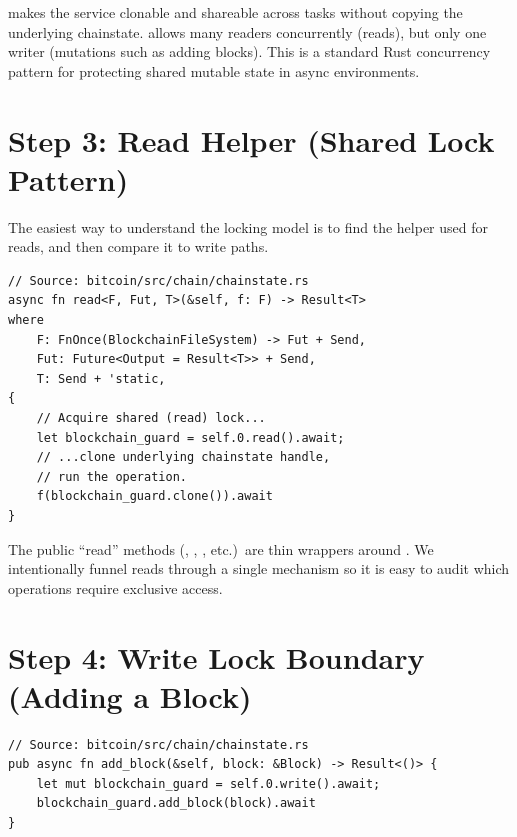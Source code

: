 \begin{infobox}
 makes the service clonable and shareable across tasks without copying the underlying chainstate.  allows many readers concurrently (reads), but only one writer (mutations such as adding blocks). This is a standard Rust concurrency pattern for protecting shared mutable state in async environments.
\end{infobox}

\section{Step 3: Read Helper (Shared Lock Pattern)}
\label{sec:ch09-2-step3}

The easiest way to understand the locking model is to find the helper used for reads, and then compare it to write paths.

\begin{listing}[htbp]
\caption{Read helper \(read\) lock + delegation}
\label{lst:ch09-2-3}
\begin{verbatim}
// Source: bitcoin/src/chain/chainstate.rs
async fn read<F, Fut, T>(&self, f: F) -> Result<T>
where
    F: FnOnce(BlockchainFileSystem) -> Fut + Send,
    Fut: Future<Output = Result<T>> + Send,
    T: Send + 'static,
{
    // Acquire shared (read) lock...
    let blockchain_guard = self.0.read().await;
    // ...clone underlying chainstate handle,
    // run the operation.
    f(blockchain_guard.clone()).await
}
\end{verbatim}
\end{listing}

\begin{checkpointbox}
The public ``read'' methods (, , , etc.)\ are thin wrappers around . We intentionally funnel reads through a single mechanism so it is easy to audit which operations require exclusive access.
\end{checkpointbox}

\section{Step 4: Write Lock Boundary (Adding a Block)}
\label{sec:ch09-2-step4}

\begin{listing}[H]
\caption{Write-lock boundary example ()}
\label{lst:ch09-2-4}
\begin{verbatim}
// Source: bitcoin/src/chain/chainstate.rs
pub async fn add_block(&self, block: &Block) -> Result<()> {
    let mut blockchain_guard = self.0.write().await;
    blockchain_guard.add_block(block).await
}
\end{verbatim}
\end{listing}

